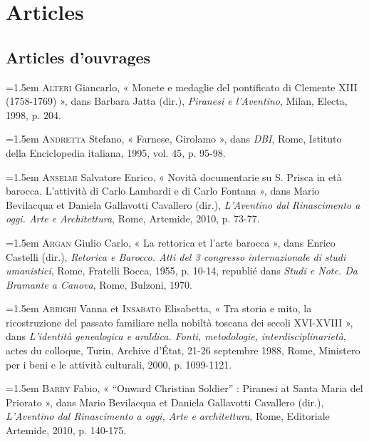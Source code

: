 \documentclass[12pt,twoside,openany]{book}
\newenvironment{PurhBibliography}
  {%
    \par
    \setlength{\parindent}{0pt}%
    \setlength{\leftskip}{0pt}%
  }
  {%
    \par
  }
\begin{document}
\section{Articles}

\subsection{Articles d’ouvrages}

\begin{PurhBibliography}
\noindent\hangindent=1.5em \textsc{Alteri} Giancarlo, « Monete e medaglie del pontificato di Clemente \textsc{XIII} (1758-1769) », dans Barbara Jatta (dir.), \textit{Piranesi e l’Aventino}, Milan, Electa, 1998, p. 204.\par
\noindent\hangindent=1.5em \textsc{Andretta} Stefano, « Farnese, Girolamo », dans \textit{DBI}, Rome, Istituto della Enciclopedia italiana, 1995, vol. 45, p. 95-98.\par
\noindent\hangindent=1.5em \textsc{Anselmi} Salvatore Enrico, « Novità documentarie su S. Prisca in età barocca. L’attività di Carlo Lambardi e di Carlo Fontana », dans Mario Bevilacqua et Daniela Gallavotti Cavallero (dir.), \textit{L’Aventino dal Rinascimento a oggi. Arte e Architettura}, Rome, Artemide, 2010, p. 73-77.\par
\noindent\hangindent=1.5em \textsc{Argan} Giulio Carlo, « La rettorica et l’arte barocca », dans Enrico Castelli (dir.), \textit{Retorica e Barocco. Atti del 3 congresso internazionale di studi umanistici}, Rome, Fratelli Bocca, 1955, p. 10-14, republié dans \textit{Studi e Note. Da Bramante a Canova}, Rome, Bulzoni, 1970.\par
\noindent\hangindent=1.5em \textsc{Arrighi} Vanna et \textsc{Insabato} Elisabetta, « Tra storia e mito, la ricostruzione del passato familiare nella nobiltà toscana dei secoli \textsc{XVI}-\textsc{XVIII} », dans \textit{L’identità genealogica e araldica. Fonti, metodologie, interdisciplinarietà}, actes du colloque, Turin, Archive d’État, 21-26 septembre 1988, Rome, Ministero per i beni e le attività culturali, 2000, p. 1099-1121.\par
\noindent\hangindent=1.5em \textsc{Barry} Fabio, « “Onward Christian Soldier” : Piranesi at Santa Maria del Priorato », dans Mario Bevilacqua et Daniela Gallavotti Cavallero (dir.), \textit{L’Aventino dal Rinascimento a oggi, Arte e architettura}, Rome, Editoriale Artemide, 2010, p. 140-175.\par

\end{PurhBibliography}
\end{document}
